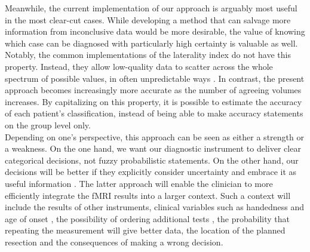 \documentclass[fleqn,10pt]{SelfArx} %
\begin{document}
Meanwhile, the current implementation of our approach is arguably most useful in the most clear-cut cases. While developing a method that can salvage more information from inconclusive data would be more desirable, the value of knowing which case can be diagnosed with particularly high certainty is valuable as well. Notably, the common implementations of the laterality index \citep{Bradshaw_2017_meth} do not have this property. Instead, they allow low-quality data to scatter across the whole spectrum of possible values, in often unpredictable ways \citep{Wilke_2007, Wegrzyn_2019}. In contrast, the present approach becomes increasingly more accurate as the number of agreeing volumes increases. By capitalizing on this property, it is possible to estimate the accuracy of each patient’s classification, instead of being able to make accuracy statements on the group level only.\\
Depending on one’s perspective, this approach can be seen as either a strength or a weakness. On the one hand, we want our diagnostic instrument to deliver clear categorical decisions, not fuzzy probabilistic statements. On the other hand, our decisions will be better if they explicitly consider uncertainty and embrace it as useful information \citep{Gelman_2018}. The latter approach will enable the clinician to more efficiently integrate the fMRI results into a larger context. Such a context will include the results of other instruments, clinical variables such as handedness and age of onset \citep{Berl_2014}, the possibility of ordering additional tests \citep{Binder_2008}, the probability that repeating the measurement will give better data, the location of the planned resection \citep{Labudda_2018} and the consequences of making a wrong decision.\\
\end{document}
